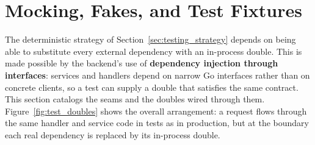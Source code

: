 \section{Mocking, Fakes, and Test Fixtures}
\label{sec:mocking_and_fixtures}

The deterministic strategy of Section~\ref{sec:testing_strategy} depends on being able to substitute every external dependency with an in-process double. This is made possible by the backend's use of \textbf{dependency injection through interfaces}: services and handlers depend on narrow Go interfaces rather than on concrete clients, so a test can supply a double that satisfies the same contract. This section catalogs the seams and the doubles wired through them. Figure~\ref{fig:test_doubles} shows the overall arrangement: a request flows through the same handler and service code in tests as in production, but at the boundary each real dependency is replaced by its in-process double.

